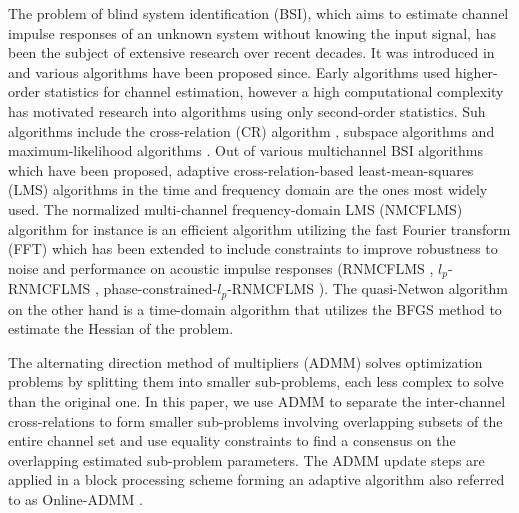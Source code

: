 \documentclass{article}
\begin{document}
The problem of blind system identification (BSI), which aims to estimate channel impulse responses of an unknown system without knowing the input signal, has been the subject of extensive research over recent decades.
It was introduced in \cite{satoMethodSelfRecoveringEqualization1975} and various algorithms have been proposed since.
Early algorithms used higher-order statistics \cite{godardSelfRecoveringEqualizationCarrier1980,tongNewApproachBlind1991,mecidel1991tutorial} for channel estimation, however a high computational complexity has motivated research into algorithms using only second-order statistics.
Suh algorithms include the cross-relation (CR) algorithm \cite{tong1994blind, guanghanxuLeastsquaresApproachBlind1995}, subspace algorithms \cite{moulinesSubspaceMethodsBlind1995,gannotSubspaceMethodsMultimicrophone2003,diamantarasEfficientSubspaceMethod2008,mayyalaStructureBasedSubspaceMethod2017} and maximum-likelihood algorithms \cite{yingbohuaFastMaximumLikelihood1996}.
Out of various multichannel BSI algorithms which have been proposed, adaptive cross-relation-based least-mean-squares (LMS) algorithms in the time and frequency domain are the ones most widely used.
The normalized multi-channel frequency-domain LMS (NMCFLMS) \cite{huangAdaptiveMultichannelLeast2002,huangClassFrequencydomainAdaptive2003} algorithm for instance is an efficient algorithm utilizing the fast Fourier transform (FFT) which has been extended to include constraints to improve robustness to noise and performance on acoustic impulse responses (RNMCFLMS \cite{huNoiseRobustBlind2015}, \(l_p\)-RNMCFLMS \cite{heNoiseRobustFrequencyDomain2018}, phase-constrained-\(l_p\)-RNMCFLMS \cite{joRobustBlindMultichannel2021}).
The quasi-Netwon algorithm \cite{habetsOnlineQuasiNewtonAlgorithm2010} on the other hand is a time-domain algorithm that utilizes the BFGS method to estimate the Hessian of the problem.

The alternating direction method of multipliers (ADMM) \cite{boydDistributedOptimizationStatistical2011} solves optimization problems by splitting them into smaller sub-problems, each less complex to solve than the original one.
In this paper, we use ADMM to separate the inter-channel cross-relations to form smaller sub-problems involving overlapping subsets of the entire channel set and use equality constraints to find a consensus on the overlapping estimated sub-problem parameters.
The ADMM update steps are applied in a block processing scheme forming an adaptive algorithm also referred to as Online-ADMM \cite{wangOnlineAlternatingDirection2013,hosseiniOnlineDistributedADMM2014}.
\end{document}
